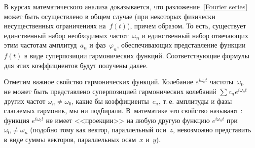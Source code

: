В курсах математического анализа доказывается, что
разложение~\eqref{Fourier series} может быть осуществлено в общем случае (при
некоторых физически несущественных
ограничениях на~$f(t)$), причем  образом.
То есть, существует единственный набор необходимых частот~$\omega_n$ и
единственный набор отвечающих этим частотам амплитуд~$a_n$ и фаз~$\varphi_n$,
обеспечивающих представление функции~$f(t)$ в виде суперпозиции гармонических
функций. Соответствующие формулы для этих коэффициентов 
будут получены далее.

\begin{lab:note}
Отметим важное свойство гармонических функций.
Колебание $e^{i\omega_0 t}$ частоты~$\omega_0$ не может быть
представлено суперпозицией гармонических колебаний $\sum c_n e^{i\omega_n t}$
других частот $\omega_n\ne\omega_0$, какие бы коэффициенты~$c_n$, т.\,е.
амплитуды и фазы слагаемых гармоник, мы ни подбирали. В~математике это
свойство называют : функция $e^{i\omega_0 t}$
не имеет <<проекции>> на любую другую функцию $e^{i\omega_nt}$ при
$\omega_0\ne\omega_n$ (подобно тому как вектор, параллельный оси~$z$,
невозможно представить в виде суммы векторов, параллельных осям~$x$ и~$y$).
\end{lab:note}

